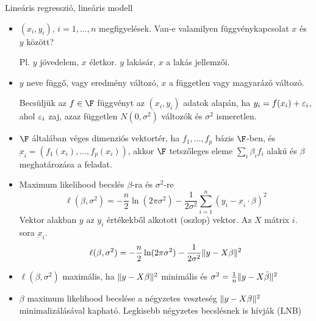 \documentclass[aspectratio=169,notheorems,9pt,\option]{beamer}\usepackage[]{graphicx}\usepackage[]{color}
\begin{document}
\maketitle

\begin{frame}{Lineáris regresszió, lineáris modell}
  \begin{itemize}
    \item $(x_i,y_i)$, $i=1,\dots,n$ megfigyelések. 
    Van-e valamilyen függvénykapcsolat $x$ és $y$ között?
    
    Pl. $y$ jövedelem, $x$ életkor. $y$ lakásár, $x$ a lakás jellemzői. 
    \item $y$ neve függő, vagy eredmény változó, $x$ a független vagy magyarázó változó.
    
    Becsüljük az $f\in \F$ függvényt az $(x_i,y_i)$ adatok alapán, ha 
    $y_i=f(x_i)+\varepsilon_i$, ahol $\varepsilon_i$ zaj, 
    azaz független $N(0,\sigma^2)$ változók és $\sigma^2$ 
    ismeretlen.
    
    \item $\F$ általában véges dimenziós vektortér, ha $f_1,\dots,f_p$ bázis $\F$-ben, 
    és $\underbar{x}_i=(f_1(x_i),\dots,f_p(x_i))$, akkor $\F$ tetszőleges eleme $\sum_i \beta_i f_i$ 
    alakú és $\beta$ meghatározása a feladat.
    
    \item Maximum likelihood becslés $\beta$-ra és $\sigma^2$-re
    \begin{displaymath}
      \ell(\beta,\sigma^2)
      =-\frac n2\ln(2\pi\sigma^2)-\frac1{2\sigma^2}\sum_{i=1}^n (y_i-\underbar{x}_i\cdot \beta)^2  
    \end{displaymath}
    Vektor alakban $y$ az $y_i$ értékekből alkotott (oszlop) vektor. Az $X$ mátrix $i$. sora $\underbar{x}_i$.
    \begin{displaymath}
      \ell(\beta,\sigma^2) = -\frac n2\ln(2\pi\sigma^2)-\frac{1}{2\sigma^2}\lVert y-X\beta\rVert^2
    \end{displaymath}
    \item $\ell(\beta,\sigma^2)$ maximális, ha $\lVert y-X\beta\rVert^2$ minimális és $\sigma^2=\frac1n\lVert y-X\hat\beta\rVert^2$ 
    \item $\beta$ maximum likelihood becslése a négyzetes veszteség $\lVert y-X\beta\rVert^2$ minimalizálásával kapható.
    Legkisebb négyzetes becslésnek is hívják (LNB)
    
  \end{itemize}
\end{frame}
\end{document}
